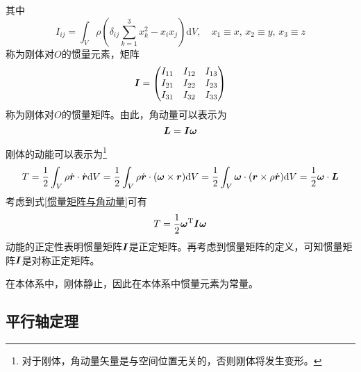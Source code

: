 其中
\begin{equation}
	I_{ij} = \int_V \rho \left(\delta_{ij}\sum_{k=1}^3 x_k^2-x_ix_j\right) \mathrm{d}V,\quad x_1 \equiv x,\,x_2 \equiv y,\,x_3 \equiv z
	\label{chapter6:惯量元素的定义式}
\end{equation}
称为刚体对$O$的{\heiti 惯量元素}，矩阵
\begin{equation}
	\boldsymbol{I} = \begin{pmatrix} I_{11} & I_{12} & I_{13} \\ I_{21} & I_{22} & I_{23} \\ I_{31} & I_{32} & I_{33} \end{pmatrix}
\end{equation}
称为刚体对$O$的{\heiti 惯量矩阵}。由此，角动量可以表示为
\begin{equation}
	\boldsymbol{L} = \boldsymbol{I} \boldsymbol{\omega}
	\label{惯量矩阵与角动量}
\end{equation}

刚体的动能可以表示为\footnote{对于刚体，角动量矢量是与空间位置无关的，否则刚体将发生变形。}
\begin{equation*}
	T = \frac12 \int_V \rho \dot{\boldsymbol{r}} \cdot \dot{\boldsymbol{r}} \mathrm{d} V = \frac12 \int_V \rho \dot{\boldsymbol{r}} \cdot (\boldsymbol{\omega} \times \boldsymbol{r}) \mathrm{d} V = \frac12 \int_V \boldsymbol{\omega} \cdot (\boldsymbol{r} \times \rho \dot{\boldsymbol{r}}) \mathrm{d} V = \frac12 \boldsymbol{\omega} \cdot \boldsymbol{L}
\end{equation*}
考虑到式\eqref{惯量矩阵与角动量}可有
\begin{equation}
	T = \frac12 \boldsymbol{\omega}^{\mathrm{T}} \boldsymbol{I} \boldsymbol{\omega}
\end{equation}
动能的正定性表明惯量矩阵$\boldsymbol{I}$是正定矩阵。再考虑到惯量矩阵的定义，可知惯量矩阵$\boldsymbol{I}$是对称正定矩阵。

在本体系中，刚体静止，因此在本体系中惯量元素为常量。

\subsection{平行轴定理}

